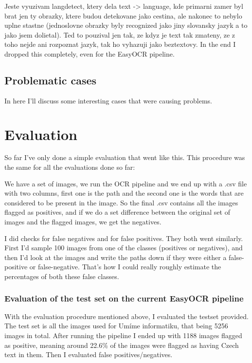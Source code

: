 \documentclass[
  digital,     %
  oneside,     %
  nosansbold,  %
  nocolorbold, %
  nolof,         %
  nolot,         %
]{fithesis4}
\begin{document}
Jeste vyuzivam langdetect, ktery dela text -> language, kde primarni zamer byl brat jen ty obrazky, ktere budou detekovane jako cestina, ale nakonec to nebylo uplne stastne (jednoslovne obrazky byly recognized jako jiny slovansky jazyk a to jako jsem dolietal). Ted to pouzival jen tak, ze kdyz je text tak zmateny, ze z toho nejde ani rozpoznat jazyk, tak ho vyhazuji jako beztextovy. In the end I dropped this completely, even for the EasyOCR pipeline.

\section{Problematic cases}

In here I'll discuss some interesting cases that were causing problems.

\chapter{Evaluation}\label{chap:evaluation}

So far I've only done a simple evaluation that went like this. This procedure was the same for all the evaluations done so far:

We have a set of images, we run the OCR pipeline and we end up with a .csv file with two columns, first one is the path and the second one is the words that are considered to be present in the image. So the final .csv contains all the images flagged as positives, and if we do a set difference between the original set of images and the flagged images, we get the negatives.

I did checks for false negatives and for false positives. They both went similarly. First I'd sample 100 images from one of the classes (positives or negatives), and then I'd look at the images and write the paths down if they were either a false-positive or false-negative. That's how I could really roughly estimate the percentages of both these false classes.

\subsection{Evaluation of the test set on the current EasyOCR pipeline}

With the evaluation procedure mentioned above, I evaluated the testset provided. The test set is all the images used for Umíme informatiku, that being 5256 images in total. After running the pipeline I ended up with 1188 images flagged as positive, meaning around 22.6\% of the images were flagged as having Czech text in them.
Then I evaluated false positives/negatives.
\end{document}
